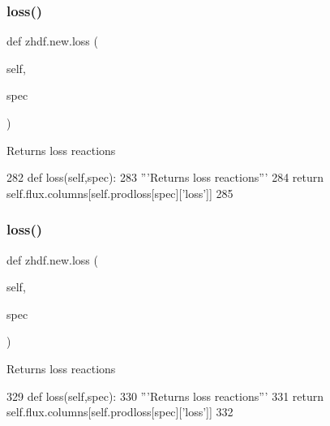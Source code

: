 \subsubsection{\texorpdfstring{loss()}{loss()}\hspace{0.1cm}{\footnotesize\ttfamily [1/2]}}
{\footnotesize\ttfamily def zhdf.\+new.\+loss (\begin{DoxyParamCaption}\item[{}]{self,  }\item[{}]{spec }\end{DoxyParamCaption})}

\begin{DoxyVerb}Returns loss reactions\end{DoxyVerb}
 
\begin{DoxyCode}
282     \textcolor{keyword}{def }loss(self,spec):
283         \textcolor{stringliteral}{'''Returns loss reactions'''}
284         \textcolor{keywordflow}{return} self.flux.columns[self.prodloss[spec][\textcolor{stringliteral}{'loss'}]]
285 
\end{DoxyCode}
\mbox{\label{classzhdf_1_1new_af05896dbaac383f107e46d76287d0ea0}} 
\subsubsection{\texorpdfstring{loss()}{loss()}\hspace{0.1cm}{\footnotesize\ttfamily [2/2]}}
{\footnotesize\ttfamily def zhdf.\+new.\+loss (\begin{DoxyParamCaption}\item[{}]{self,  }\item[{}]{spec }\end{DoxyParamCaption})}

\begin{DoxyVerb}Returns loss reactions\end{DoxyVerb}
 
\begin{DoxyCode}
329     \textcolor{keyword}{def }loss(self,spec):
330         \textcolor{stringliteral}{'''Returns loss reactions'''}
331         \textcolor{keywordflow}{return} self.flux.columns[self.prodloss[spec][\textcolor{stringliteral}{'loss'}]]
332 
\end{DoxyCode}
\mbox{\label{classzhdf_1_1new_a9745f192f8c6f7e375a6fada1f44525a}} 

